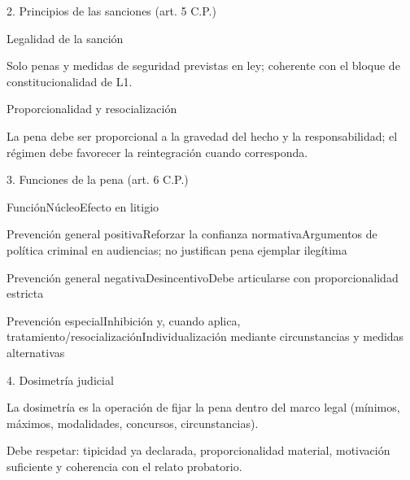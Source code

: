 \documentclass[11pt,a4paper]{article}
\begin{document}
      2. Principios de las sanciones (art. 5 C.P.)\par



          Legalidad de la sanción\par

          Solo penas y medidas de seguridad previstas en ley; coherente con el bloque de constitucionalidad de L1.\par




          Proporcionalidad y resocialización\par

          La pena debe ser proporcional a la gravedad del hecho y la responsabilidad; el régimen debe favorecer la reintegración cuando corresponda.\par








      3. Funciones de la pena (art. 6 C.P.)\par



          FunciónNúcleoEfecto en litigio\par




          Prevención general positivaReforzar la confianza normativaArgumentos de política criminal en audiencias; no justifican pena ejemplar ilegítima\par

          Prevención general negativaDesincentivoDebe articularse con proporcionalidad estricta\par

          Prevención especialInhibición y, cuando aplica, tratamiento/resocializaciónIndividualización mediante circunstancias y medidas alternativas\par








      4. Dosimetría judicial\par


        La dosimetría es la operación de fijar la pena dentro del marco legal (mínimos, máximos, modalidades, concursos, circunstancias).\par
        Debe respetar: tipicidad ya declarada, proporcionalidad material, motivación suficiente y coherencia con el relato probatorio.\par
\end{document}
